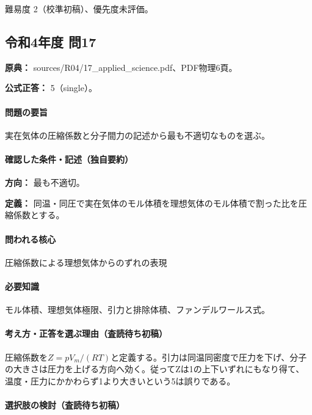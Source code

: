 \par 難易度 2（校準初稿）、優先度未評価。

\subsection{令和4年度 問17}
\label{q:r04-reg-applied-17}

\noindent\textbf{原典：} sources/R04/17\_applied\_science.pdf、PDF物理6頁。

\textbf{公式正答：} 5（single）。

\paragraph{問題の要旨} 実在気体の圧縮係数と分子間力の記述から最も不適切なものを選ぶ。

\paragraph{確認した条件・記述（独自要約）}\mbox{}\par

\noindent\textbf{方向：} 最も不適切。\par

\noindent\textbf{定義：} 同温・同圧で実在気体のモル体積を理想気体のモル体積で割った比を圧縮係数とする。\par

\paragraph{問われる核心} 圧縮係数による理想気体からのずれの表現

\paragraph{必要知識} モル体積、理想気体極限、引力と排除体積、ファンデルワールス式。

\paragraph{考え方・正答を選ぶ理由（査読待ち初稿）} 圧縮係数を\(Z=pV_m/(RT)\)と定義する。引力は同温同密度で圧力を下げ、分子の大きさは圧力を上げる方向へ効く。従ってZは1の上下いずれにもなり得て、温度・圧力にかかわらず1より大きいという5は誤りである。

\paragraph{選択肢の検討（査読待ち初稿）}\mbox{}\par

